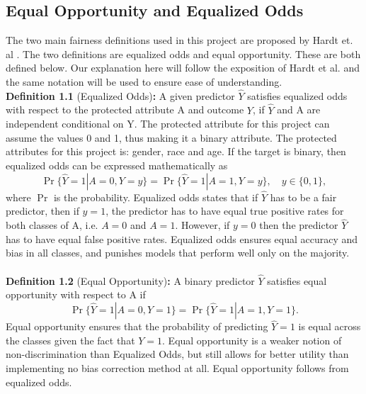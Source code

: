 \documentclass[11pt, fleqn, titlepage]{article}
\begin{document}
	\subsection{Equal Opportunity and Equalized Odds}\label{bias_def}
	The two main fairness definitions used in this project are proposed by Hardt et. al \cite{equal_of_oppor}. The two definitions are equalized odds and equal opportunity. These are both defined below. Our explanation here will follow the exposition of Hardt et al. and the same notation will be used to ensure ease of understanding.   \\ \newline \textbf{Definition 1.1} (Equalized Odds)\textbf{:} A given predictor $ \hat Y $ satisfies equalized odds with respect to the protected attribute A and outcome $ Y $, if $ \hat Y $ and A are independent conditional on Y. The protected attribute for this project can assume the values 0 and 1, thus making it a binary attribute. The protected attributes for this project is: gender, race and age. If the target is binary, then equalized odds can be expressed mathematically as
	\begin{equation*}\label{key}
	\operatorname{Pr}\{\widehat{Y}=1 | A=0, Y=y\}=\operatorname{Pr}\{\hat{Y}=1 | A=1, Y=y\}, \quad y \in\{0,1\},
	\end{equation*}
	where $\operatorname{Pr}$ is the probability. Equalized odds states that if $ \hat Y $ has to be a fair predictor, then if $ y = 1 $, the predictor has to have equal true positive rates for both classes of A, i.e. $ A = 0 $  and $ A = 1 $. However, if $ y = 0 $ then the predictor $ \hat Y $ has to have equal false positive rates. Equalized odds ensures equal accuracy and bias in all classes, and punishes models that perform well only on the majority.
	\\\\
	\textbf{Definition 1.2} (Equal Opportunity)\textbf{:} A binary predictor $ \hat Y $ satisfies equal opportunity with respect to A if 
	\begin{equation*}
		\operatorname{Pr}\{\hat{Y}=1 | A=0, Y=1\}=\operatorname{Pr}\{\hat{Y}=1 | A=1, Y=1\}.
	\end{equation*}
	Equal opportunity ensures that the probability of predicting $ \hat Y = 1 $ is equal across the classes given the fact that $ Y = 1 $. Equal opportunity is a weaker notion of non-discrimination than Equalized Odds, but still allows for better utility than implementing no bias correction method at all. Equal opportunity follows from equalized odds.
	
\end{document}
